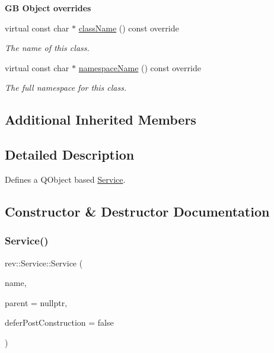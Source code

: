 \begin{Indent}\textbf{ GB Object overrides}\par
\begin{DoxyCompactItemize}
\item 
virtual const char $\ast$ \mbox{\hyperlink{classrev_1_1_service_a484d71757ea6e8780488602cb421a4a5}{class\+Name}} () const override
\begin{DoxyCompactList}\small\item\em The name of this class. \end{DoxyCompactList}\item 
virtual const char $\ast$ \mbox{\hyperlink{classrev_1_1_service_a831f5bf8c53584ec830aaee38ea58e7b}{namespace\+Name}} () const override
\begin{DoxyCompactList}\small\item\em The full namespace for this class. \end{DoxyCompactList}\end{DoxyCompactItemize}
\end{Indent}
\subsection*{Additional Inherited Members}


\subsection{Detailed Description}
Defines a Q\+Object based \mbox{\hyperlink{classrev_1_1_service}{Service}}. 

\subsection{Constructor \& Destructor Documentation}
\mbox{\label{classrev_1_1_service_aeb56f97a50b0bb4b296adaa4c10d97f5}} 
\subsubsection{\texorpdfstring{Service()}{Service()}}
{\footnotesize\ttfamily rev\+::\+Service\+::\+Service (\begin{DoxyParamCaption}\item[{const char $\ast$}]{name,  }\item[{Q\+Object $\ast$}]{parent = {\ttfamily nullptr},  }\item[{bool}]{defer\+Post\+Construction = {\ttfamily false} }\end{DoxyParamCaption})}



